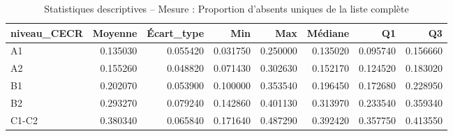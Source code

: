 \begin{table}
\caption{Statistiques descriptives – Mesure : Proportion d'absents uniques de la liste complète}
\label{tab:stats_PA_SUBTLEX_MAX_U}
\begin{tabular}{lrrrrrrr}
\toprule
niveau_CECR & Moyenne & Écart_type & Min & Max & Médiane & Q1 & Q3 \\
\midrule
A1 & 0.135030 & 0.055420 & 0.031750 & 0.250000 & 0.135020 & 0.095740 & 0.156660 \\
A2 & 0.155260 & 0.048820 & 0.071430 & 0.302630 & 0.152170 & 0.124520 & 0.183020 \\
B1 & 0.202070 & 0.053900 & 0.100000 & 0.353540 & 0.196450 & 0.172680 & 0.228950 \\
B2 & 0.293270 & 0.079240 & 0.142860 & 0.401130 & 0.313970 & 0.233540 & 0.359340 \\
C1-C2 & 0.380340 & 0.065840 & 0.171640 & 0.487290 & 0.392420 & 0.357750 & 0.413550 \\
\bottomrule
\end{tabular}
\end{table}
